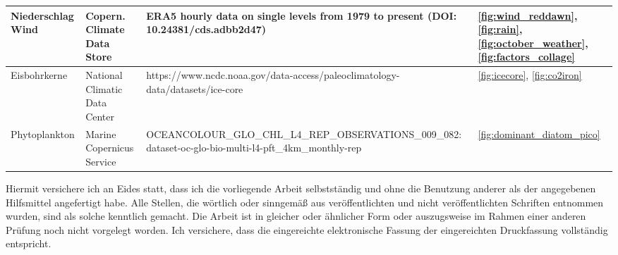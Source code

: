 \documentclass[12pt,a4paper,onecolumn,headheight=30pt]{scrartcl}
\begin{document}
\begin{table}[H]
\begin{scriptsize}
\begin{sloppypar}
\begin{tabularx}{\textwidth}{p{2cm} p{2.5cm} X p{2cm}}
Niederschlag \newline Wind & Copern. Climate \newline Data Store & ERA5 hourly data on single levels from 1979 to present (DOI: 10.24381/cds.adbb2d47) & \ref{fig:wind_reddawn}, \ref{fig:rain}, \ref{fig:october_weather}, \ref{fig:factors_collage} \\ \midrule
Eisbohrkerne & National Climatic \newline Data Center &  https://www.ncdc.noaa.gov/data-access/paleoclimatology-data/datasets/ice-core & \ref{fig:icecore}, \ref{fig:co2iron} \\ \midrule
Phytoplankton & Marine Copernicus Service & OCEANCOLOUR_GLO_CHL_L4_REP_OBSERVATIONS_009_082: dataset-oc-glo-bio-multi-l4-pft_4km_monthly-rep & \ref{fig:dominant_diatom_pico} \\ 
\bottomrule
\end{tabularx}
\end{sloppypar}
\end{scriptsize}
\end{table}
Hiermit versichere ich an Eides statt, dass ich die vorliegende Arbeit selbstständig und ohne die Benutzung anderer als der angegebenen  Hilfsmittel angefertigt habe. Alle Stellen, die wörtlich oder sinngemäß  aus veröffentlichten und nicht veröffentlichten Schriften entnommen wurden,  sind als solche kenntlich gemacht. Die Arbeit ist in gleicher oder  ähnlicher Form oder  auszugsweise im Rahmen einer anderen Prüfung noch nicht vorgelegt worden. Ich versichere, dass die eingereichte  elektronische Fassung der eingereichten Druckfassung vollständig  entspricht.
\end{document}

